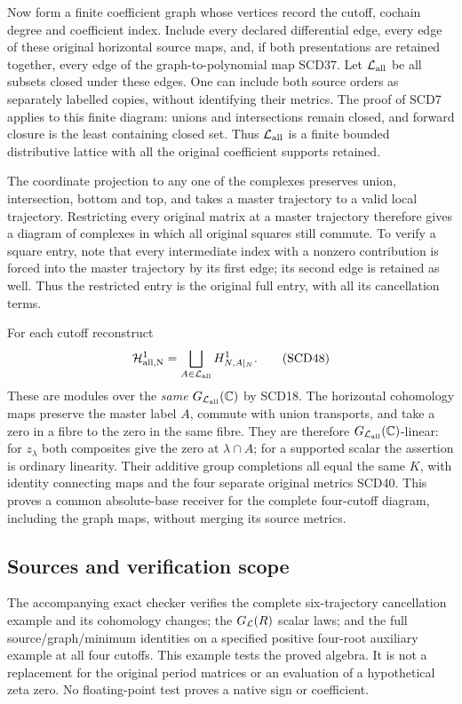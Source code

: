 Now form a finite coefficient graph whose vertices record the cutoff,
cochain degree and coefficient index. Include every declared differential
edge, every edge of these original horizontal source maps, and, if both
presentations are retained together, every edge of the graph-to-polynomial
map SCD37. Let \(\mathcal L_{\rm all}\) be all subsets closed under these edges.
One can include both source orders as separately labelled copies, without
identifying their metrics. The proof of SCD7 applies to this finite
diagram: unions and intersections remain closed, and forward closure is
the least containing closed set. Thus \(\mathcal L_{\rm all}\) is a finite bounded
distributive lattice with all the original coefficient supports retained.

The coordinate projection to any one of the complexes preserves union,
intersection, bottom and top, and takes a master trajectory to a valid
local trajectory. Restricting every original matrix at a master trajectory
therefore gives a diagram of complexes in which all original squares
still commute. To verify a square entry, note that every intermediate
index with a nonzero contribution is forced into the master trajectory
by its first edge; its second edge is retained as well. Thus the restricted
entry is the original full entry, with all its cancellation terms.

For each cutoff reconstruct
\[
 \mathcal H_{\rm all,N}^1
 =\bigsqcup_{A\in\mathcal L_{\rm all}}H^1_{N,A|_N}.
 \tag{SCD48}
\]
These are modules over the \emph{same} \(G_{\mathcal L_{\rm all}}(\mathbb C)\) by
SCD18. The horizontal cohomology maps preserve the master label \(A\),
commute with union transports, and take a zero in a fibre to the zero in
the same fibre. They are therefore \(G_{\mathcal L_{\rm all}}(\mathbb C)\)-linear:
for \(z_\lambda\) both composites give the zero at \(\lambda\cap A\);
for a supported scalar the assertion is ordinary linearity.
Their additive group completions all equal the same \(K\), with identity
connecting maps and the four separate original metrics SCD40.
This proves a common absolute-base receiver for the complete four-cutoff
diagram, including the graph maps, without merging its source metrics.


\subsection{Sources and verification scope}

The accompanying exact checker verifies the complete six-trajectory
cancellation example and its cohomology changes; the \(G_{\mathcal L}(R)\)
scalar laws; and the full source/graph/minimum identities on a
specified positive four-root auxiliary example at all four cutoffs.
This example tests the proved algebra. It is not a replacement
for the original period matrices or an evaluation of a hypothetical
zeta zero. No floating-point test proves a native sign or coefficient.

